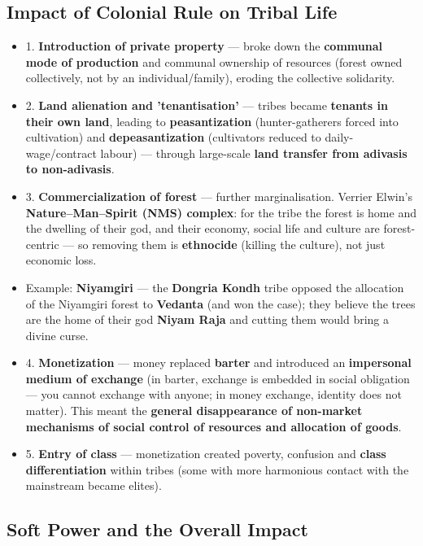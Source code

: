\subsection{Impact of Colonial Rule on Tribal Life}

\begin{KeyConcept}
\begin{itemize}
\item 1. \textbf{Introduction of private property} --- broke down the \textbf{communal mode of production} and communal ownership of resources (forest owned collectively, not by an individual/family), eroding the collective solidarity.
\item 2. \textbf{Land alienation and 'tenantisation'} --- tribes became \textbf{tenants in their own land}, leading to \textbf{peasantization} (hunter-gatherers forced into cultivation) and \textbf{depeasantization} (cultivators reduced to daily-wage/contract labour) --- through large-scale \textbf{land transfer from adivasis to non-adivasis}.
\item 3. \textbf{Commercialization of forest} --- further marginalisation. Verrier Elwin's \textbf{Nature--Man--Spirit (NMS) complex}: for the tribe the forest is home and the dwelling of their god, and their economy, social life and culture are forest-centric --- so removing them is \textbf{ethnocide} (killing the culture), not just economic loss.
\item Example: \textbf{Niyamgiri} --- the \textbf{Dongria Kondh} tribe opposed the allocation of the Niyamgiri forest to \textbf{Vedanta} (and won the case); they believe the trees are the home of their god \textbf{Niyam Raja} and cutting them would bring a divine curse.
\item 4. \textbf{Monetization} --- money replaced \textbf{barter} and introduced an \textbf{impersonal medium of exchange} (in barter, exchange is embedded in social obligation --- you cannot exchange with anyone; in money exchange, identity does not matter). This meant the \textbf{general disappearance of non-market mechanisms of social control of resources and allocation of goods}.
\item 5. \textbf{Entry of class} --- monetization created poverty, confusion and \textbf{class differentiation} within tribes (some with more harmonious contact with the mainstream became elites).
\end{itemize}
\end{KeyConcept}

\subsection{Soft Power and the Overall Impact}


